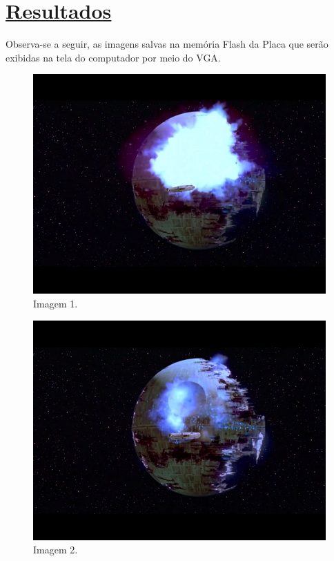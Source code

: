 \documentclass[14pt, oneside]{book}
\newcommand\tab[1][1cm]{\hspace*{#1}}
\theoremstyle{definition}
\begin{document}
                
         
         \chapter[Resultados]{\hyperlink{toc}{Resultados}}
            
            \tab Observa-se a seguir, as imagens salvas na memória Flash da Placa que serão exibidas na tela do computador por meio do VGA. 
            
                \begin{multicols}{2}
                    \begin{figure}[H]
                        \centering
                        \includegraphics[scale=0.65]{img1.png}
                        \caption{Imagem 1.}
                        \label{manual}
                     \end{figure}
                
                    \begin{figure}[H]
                        \centering
                        \includegraphics[scale=0.65]{img2.png}
                        \caption{Imagem 2.}
                        \label{manual}
                    \end{figure}
              

\end{multicols}
\end{document}
